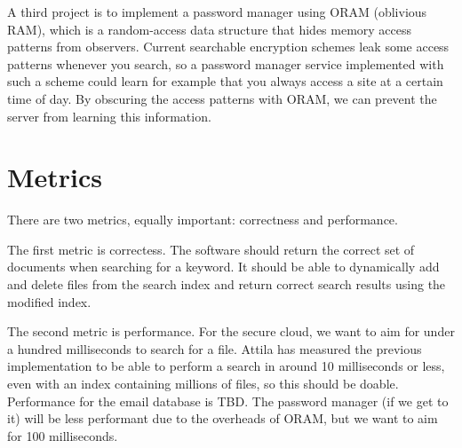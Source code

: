 \documentclass[onecolumn, draftclsnofoot,10pt, compsoc]{IEEEtran}
\begin{document}



A third project is to implement a password manager using ORAM (oblivious RAM),
which is a random-access data structure that hides memory access patterns from observers.
Current searchable encryption schemes leak some access patterns whenever you search,
so a password manager service implemented with such a scheme could learn for example that you always access a site at a certain time of day.
By obscuring the access patterns with ORAM, we can prevent the server from learning this information.


\section{Metrics}

There are two metrics, equally important: correctness and performance.


The first metric is correctess.
The software should return the correct set of documents when searching for a keyword.
It should be able to dynamically add and delete files from the search index and return correct search results using the modified index.


The second metric is performance.
For the secure cloud, we want to aim for under a hundred milliseconds to search for a file. %
Attila has measured the previous implementation to be able to perform a search in around 10 milliseconds or less, even with an index containing millions of files, so this should be doable.
Performance for the email database is TBD.
The password manager (if we get to it) will be less performant due to the overheads of ORAM, but we want to aim for 100 milliseconds.


{}
\end{document}
